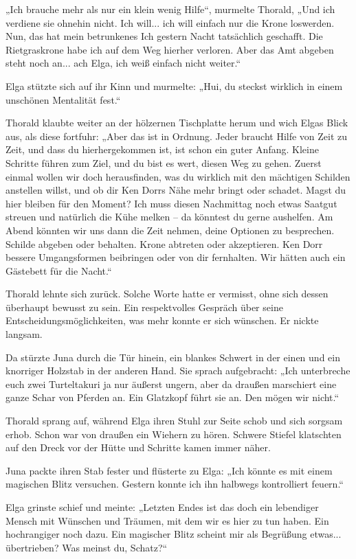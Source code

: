 „Ich brauche mehr als nur ein klein wenig Hilfe“, murmelte Thorald, „Und ich verdiene sie ohnehin nicht. Ich will... ich will einfach nur die Krone loswerden. Nun, das hat mein betrunkenes Ich gestern Nacht tatsächlich geschafft. Die Rietgraskrone habe ich auf dem Weg hierher verloren. Aber das Amt abgeben steht noch an... ach Elga, ich weiß einfach nicht weiter.“

Elga stützte sich auf ihr Kinn und murmelte: „Hui, du steckst wirklich in einem unschönen Mentalität fest.“

Thorald klaubte weiter an der hölzernen Tischplatte herum und wich Elgas Blick aus, als diese fortfuhr: „Aber das ist in Ordnung. Jeder braucht Hilfe von Zeit zu Zeit, und dass du hierhergekommen ist, ist schon ein guter Anfang. Kleine Schritte führen zum Ziel, und du bist es wert, diesen Weg zu gehen. Zuerst einmal wollen wir doch herausfinden, was du wirklich mit den mächtigen Schilden anstellen willst, und ob dir Ken Dorrs Nähe mehr bringt oder schadet. Magst du hier bleiben für den Moment? Ich muss diesen Nachmittag noch etwas Saatgut streuen und natürlich die Kühe melken – da könntest du gerne aushelfen. Am Abend könnten wir uns dann die Zeit nehmen, deine Optionen zu besprechen. Schilde abgeben oder behalten. Krone abtreten oder akzeptieren. Ken Dorr bessere Umgangsformen beibringen oder von dir fernhalten. Wir hätten auch ein Gästebett für die Nacht.“

Thorald lehnte sich zurück. Solche Worte hatte er vermisst, ohne sich dessen überhaupt bewusst zu sein. Ein respektvolles Gespräch über seine Entscheidungsmöglichkeiten, was mehr konnte er sich wünschen. Er nickte langsam.

Da stürzte Juna durch die Tür hinein, ein blankes Schwert in der einen und ein knorriger Holzstab in der anderen Hand. Sie sprach aufgebracht: „Ich unterbreche euch zwei Turteltakuri ja nur äußerst ungern, aber da draußen marschiert eine ganze Schar von Pferden an. Ein Glatzkopf führt sie an. Den mögen wir nicht.“

Thorald sprang auf, während Elga ihren Stuhl zur Seite schob und sich sorgsam erhob. Schon war von draußen ein Wiehern zu hören. Schwere Stiefel klatschten auf den Dreck vor der Hütte und Schritte kamen immer näher.

Juna packte ihren Stab fester und flüsterte zu Elga: „Ich könnte es mit einem magischen Blitz versuchen. Gestern konnte ich ihn halbwegs kontrolliert feuern.“

Elga grinste schief und meinte: „Letzten Endes ist das doch ein lebendiger Mensch mit Wünschen und Träumen, mit dem wir es hier zu tun haben. Ein hochrangiger noch dazu. Ein magischer Blitz scheint mir als Begrüßung etwas... übertrieben? Was meinst du, Schatz?“


